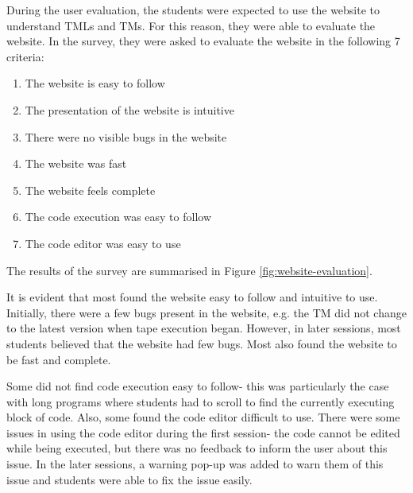 During the user evaluation, the students were expected to use the website to understand TMLs and TMs. For this reason, they were able to evaluate the website. In the survey, they were asked to evaluate the website in the following 7 criteria:
\begin{enumerate}
    \item The website is easy to follow
    \item The presentation of the website is intuitive
    \item There were no visible bugs in the website
    \item The website was fast
    \item The website feels complete
    \item The code execution was easy to follow
    \item The code editor was easy to use
\end{enumerate}
The results of the survey are summarised in Figure \ref{fig:website-evaluation}. 

It is evident that most found the website easy to follow and intuitive to use. Initially, there were a few bugs present in the website, e.g. the TM did not change to the latest version when tape execution began. However, in later sessions, most students believed that the website had few bugs. Most also found the website to be fast and complete. 

Some did not find code execution easy to follow- this was particularly the case with long programs where students had to scroll to find the currently executing block of code. Also, some found the code editor difficult to use. There were some issues in using the code editor during the first session- the code cannot be edited while being executed, but there was no feedback to inform the user about this issue. In the later sessions, a warning pop-up was added to warn them of this issue and students were able to fix the issue easily.


